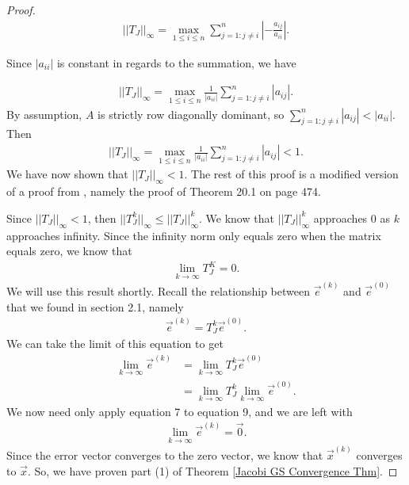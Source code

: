\documentclass[12pt,letterpaper]{article}
\theoremstyle{definition}
\begin{document}
\begin{proof}
\begin{align*}||T_{J}||_{\infty} = \max_{1\leq i\leq n}\sum_{j=1:j\neq i}^{n}\left|-\frac{a_{ij}}{a_{ii}}\right|.\end{align*}

Since $|a_{ii}|$ is constant in regards to the summation, we have 

\begin{align*}||T_{J}||_{\infty} = \max_{1\leq i\leq n}\frac{1}{|a_{ii}|}\sum_{j=1:j\neq i}^{n}|a_{ij}|.\end{align*} By assumption, $A$ is strictly row diagonally dominant, so $\sum_{j=1:j\neq i}^{n}|a_{ij}| < |a_{ii}|$. Then \begin{align*}||T_{J}||_{\infty} = \max_{1\leq i\leq n}\frac{1}{|a_{ii}|}\sum_{j=1:j\neq i}^{n}|a_{ij}| < 1.\end{align*} We have now shown that $||T_{J}||_{\infty} < 1$. The rest of this proof is a modified version of a proof from \cite{Ford15}, namely the proof of Theorem 20.1 on page 474.

Since $||T_{J}||_{\infty} < 1$, then $||T_{J}^{k}||_\infty \leq ||T_{J}||_\infty^{k}$. We know that $||T_J||^k_\infty$ approaches $0$ as $k$ approaches infinity. Since the infinity norm only equals zero when the matrix equals zero, we know that \begin{align}\lim_{k\to\infty}T_J^K = 0.\end{align} We will use this result shortly.
Recall the relationship between $\vec{e}^{(k)}$ and $\vec{e}^{(0)}$ that we found in section 2.1, namely
\begin{align*} \vec{e}^{(k)} = T_J^k\vec{e}^{(0)}.\end{align*}
We can take the limit of this equation to get
\begin{align} \lim_{k \to \infty}\vec{e}^{(k)} &= \lim_{k \to \infty}T_J^{k}\vec{e}^{(0)}\\
&= \lim_{k \to \infty}T_J^{k}\lim_{k \to \infty}\vec{e}^{(0)}. \end{align}
We now need only apply equation 7 to equation 9, and we are left with
\begin{align*} \lim_{k \to \infty}\vec{e}^{(k)} = \vec{0}.\end{align*}
Since the error vector converges to the zero vector, we know that $\vec{x}^{(k)}$ converges to $\vec{x}$. So, we have proven part (1) of Theorem \ref{Jacobi GS Convergence Thm}.
\end{proof}
\end{document}
